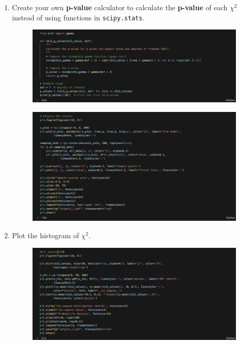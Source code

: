 \documentclass[12pt,a4paper]{article}
\begin{document}
\begin{CJK}{UTF8}{bkai}
\begin{enumerate}
\begin{figure}[h]
        \label{fig:code_1_3}
    \end{figure}
    \item Create your own \textbf{p-value} calculator to calculate the \textbf{p-value} of each $\chi^2$ instead of using functions in \texttt{scipy.stats}.
    \begin{figure}[h]
        \centering
        \includegraphics[width=1\linewidth]{figures/code/practice_1/code_1_6.png}
        \label{fig:code_1_6}
    \end{figure}
    \begin{figure}[h]
        \centering
        \includegraphics[width=1\linewidth]{figures/code/practice_1/code_1_4.png}
        \label{fig:code_1_4}
    \end{figure}
    \item Plot the histogram of $\chi^2$.
    \begin{figure}[h]
        \centering
        \includegraphics[width=1\linewidth]{figures/code/practice_1/code_1_5.png}

\end{figure}
\end{enumerate}
\end{CJK}
\end{document}
